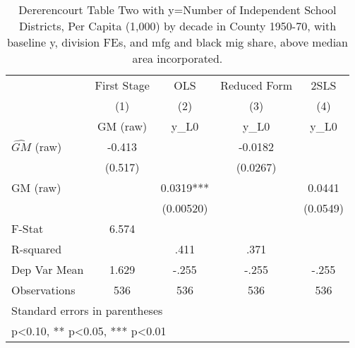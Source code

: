 \begin{table}[htbp]\centering
\def\sym#1{\ifmmode^{#1}\else\(^{#1}\)\fi}
\caption{Dererencourt Table Two with y=Number of Independent School Districts, Per Capita (1,000) by decade in County 1950-70, with baseline y, division FEs, and mfg and black mig share, above median area incorporated.}
\begin{tabular}{l*{4}{c}}
\toprule
                    & First Stage   &         OLS   &Reduced Form   &        2SLS   \\
                    &\multicolumn{1}{c}{(1)}&\multicolumn{1}{c}{(2)}&\multicolumn{1}{c}{(3)}&\multicolumn{1}{c}{(4)}\\
                    &\multicolumn{1}{c}{GM  (raw)}&\multicolumn{1}{c}{y\_L0}&\multicolumn{1}{c}{y\_L0}&\multicolumn{1}{c}{y\_L0}\\
\midrule
$\hat{GM}$ (raw)    &      -0.413   &               &     -0.0182   &               \\
                    &     (0.517)   &               &    (0.0267)   &               \\
\addlinespace
GM  (raw)           &               &      0.0319***&               &      0.0441   \\
                    &               &   (0.00520)   &               &    (0.0549)   \\
\midrule
F-Stat              &       6.574   &               &               &               \\
R-squared           &               &        .411   &        .371   &               \\
Dep Var Mean        &       1.629   &       -.255   &       -.255   &       -.255   \\
Observations        &         536   &         536   &         536   &         536   \\
\bottomrule
\multicolumn{5}{l}{\footnotesize Standard errors in parentheses}\\
\multicolumn{5}{l}{\footnotesize * p<0.10, ** p<0.05, *** p<0.01}\\
\end{tabular}
\end{table}

